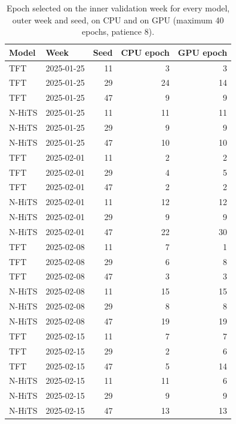 \begin{table}[!htbp]\centering\footnotesize
\caption{Epoch selected on the inner validation week for every model, outer week and seed, on CPU and on GPU (maximum 40 epochs, patience 8).}\label{tab:s_epochs}
\begin{tabular}{@{}llrrr@{}}\toprule
Model & Week & Seed & CPU epoch & GPU epoch \\\midrule
TFT & 2025-01-25 & 11 & 3 & 3 \\
TFT & 2025-01-25 & 29 & 24 & 14 \\
TFT & 2025-01-25 & 47 & 9 & 9 \\
N-HiTS & 2025-01-25 & 11 & 11 & 11 \\
N-HiTS & 2025-01-25 & 29 & 9 & 9 \\
N-HiTS & 2025-01-25 & 47 & 10 & 10 \\
TFT & 2025-02-01 & 11 & 2 & 2 \\
TFT & 2025-02-01 & 29 & 4 & 5 \\
TFT & 2025-02-01 & 47 & 2 & 2 \\
N-HiTS & 2025-02-01 & 11 & 12 & 12 \\
N-HiTS & 2025-02-01 & 29 & 9 & 9 \\
N-HiTS & 2025-02-01 & 47 & 22 & 30 \\
TFT & 2025-02-08 & 11 & 7 & 1 \\
TFT & 2025-02-08 & 29 & 6 & 8 \\
TFT & 2025-02-08 & 47 & 3 & 3 \\
N-HiTS & 2025-02-08 & 11 & 15 & 15 \\
N-HiTS & 2025-02-08 & 29 & 8 & 8 \\
N-HiTS & 2025-02-08 & 47 & 19 & 19 \\
TFT & 2025-02-15 & 11 & 7 & 7 \\
TFT & 2025-02-15 & 29 & 2 & 6 \\
TFT & 2025-02-15 & 47 & 5 & 14 \\
N-HiTS & 2025-02-15 & 11 & 11 & 6 \\
N-HiTS & 2025-02-15 & 29 & 9 & 9 \\
N-HiTS & 2025-02-15 & 47 & 13 & 13 \\
\bottomrule
\end{tabular}
\end{table}

